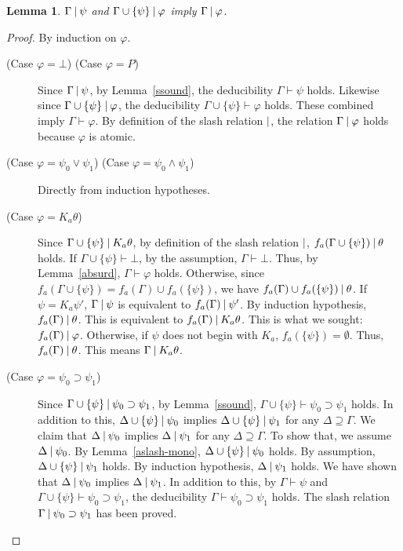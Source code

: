 \documentclass[doctor]{iscs-thesis}
\newtheorem{lemma}{Lemma}
\begin{document}
\begin{lemma}
 \label{slash-deduction}
 $\Gamma\mathbin{\mid}\psi$ and $\Gamma\cup\{\psi\}\mathbin{\mid}
 \varphi$ imply $\Gamma\mathbin{\mid}\varphi$.
\end{lemma}
\begin{proof}
 By induction on $\varphi$.
 \begin{description}
  \item[ (Case $\varphi = \bot$) (Case $\varphi = P$)]
	     Since $\Gamma\mathbin{\mid}\psi$, by Lemma~\ref{ssound},
	     the deducibility $\Gamma\vdash\psi$ holds.
	     Likewise since $\Gamma\cup \{\psi\}\mathbin{\mid}\varphi$, the deducibility $\Gamma\cup
	     \{\psi\}\vdash \varphi$ holds.
	     These combined imply $\Gamma\vdash\varphi$.
	     By definition of the slash relation $\mathbin{\mid}$, the relation
	     $\Gamma\mathbin{\mid}\varphi$ holds because $\varphi$ is
	     atomic. 
  \item[ (Case $\varphi = \psi_0\vee\psi_1$) (Case $\varphi =\psi_0\wedge\psi_1$)]
	     Directly from induction hypotheses.
  \item[ (Case $\varphi = K_a\theta$)]
	     Since $\Gamma\cup\{\psi\}\mathbin{\mid} K_a\theta$, by definition of the slash
	     relation $\mathbin{\mid}$,
	     $f_a(\Gamma\cup\{\psi\})\mathbin{\mid} \theta$ holds.
	     If $\Gamma\cup\{\psi\}\vdash\bot$, by the assumption,
	     $\Gamma\vdash\bot$. Thus, by Lemma~\ref{absurd}, $\Gamma\vdash\varphi$ holds.
	     Otherwise, since $f_a(\Gamma\cup\{\psi\}) = f_a(\Gamma)\cup f_a(\{\psi\})$,
	     we have $f_a(\Gamma)\cup f_a(\{\psi\})\mathbin{\mid} \theta$.
	     If $\psi = K_a\psi'$,
	     $\Gamma\mathbin{\mid}\psi$ is equivalent to $f_a(\Gamma)\mathbin{\mid} \psi'$.
	     By induction hypothesis, $f_a(\Gamma)\mathbin{\mid}\theta$.
	     This is equivalent to $f_a(\Gamma)\mathbin{\mid} K_a\theta$.
	     This is what we sought: $f_a(\Gamma)\mathbin{\mid}\varphi$.
	     Otherwise, if $\psi$ does not begin with $K_a$,
	     $f_a(\{\psi\}) = \emptyset$.
	     Thus, $f_a(\Gamma)\mathbin{\mid}\theta$.
	     This means $\Gamma \mathbin{\mid} K_a\theta$.
  \item[ (Case $\varphi = \psi_0\supset\psi_1$)]
	     Since $\Gamma\cup\{\psi\}\mathbin{\mid} \psi_0\supset\psi_1$,
	     by Lemma~\ref{ssound},
	     $\Gamma\cup\{\psi\}\vdash\psi_0\supset \psi_1$ holds.
	     In addition to this,
	     $\Delta\cup\{\psi\}\mathbin{\mid} \psi_0$ implies
	     $\Delta\cup\{\psi\}\mathbin{\mid} \psi_1$ for any $\Delta\supseteq \Gamma$.
	     We claim that $\Delta\mathbin{\mid} \psi_0$ implies $\Delta\mathbin{\mid} \psi_1$ for any
	     $\Delta\supseteq \Gamma$.
	     To show that, we assume $\Delta\mathbin{\mid}\psi_0$.
	     By Lemma~\ref{aslash-mono},
	     $\Delta\cup\{\psi\}\mathbin{\mid} \psi_0$ holds.
	     By assumption, $\Delta\cup\{\psi\}\mathbin{\mid}\psi_1$ holds.
	     By induction hypothesis, $\Delta\mathbin{\mid}\psi_1$ holds.
	     We have shown that 
	     $\Delta\mathbin{\mid} \psi_0$ implies $\Delta\mathbin{\mid} \psi_1$.
	     In addition to this, by $\Gamma\vdash\psi$ and
	     $\Gamma\cup\{\psi\}\vdash\psi_0\supset\psi_1$, the deducibility
	     $\Gamma\vdash\psi_0\supset \psi_1$ holds.
	     The slash relation $\Gamma\mathbin{\mid}\psi_0\supset \psi_1$ has been proved.
 \end{description}
\end{proof}
\end{document}
